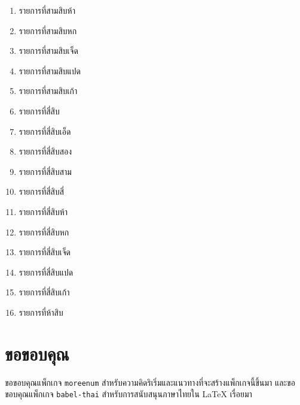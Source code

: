 \documentclass[11pt]{ltxguide}
\begin{document}
\begin{multicols}{4}
\begin{enumerate}[listparindent=0pc,topsep=0pc,itemsep=0pc,label={\thaimultialph*.}]
        \item  รายการที่สามสิบห้า
        \item  รายการที่สามสิบหก
        \item  รายการที่สามสิบเจ็ด
        \item  รายการที่สามสิบแปด
        \item  รายการที่สามสิบเก้า
        \item  รายการที่สี่สิบ
        \item  รายการที่สี่สิบเอ็ด
        \item  รายการที่สี่สิบสอง
        \item  รายการที่สี่สิบสาม
        \item  รายการที่สี่สิบสี่
        \item  รายการที่สี่สิบห้า
        \item  รายการที่สี่สิบหก
        \item  รายการที่สี่สิบเจ็ด
        \item  รายการที่สี่สิบแปด
        \item  รายการที่สี่สิบเก้า
        \item  รายการที่ห้าสิบ
    \end{enumerate}
\end{multicols}

\section{ขอขอบคุณ}

ขอขอบคุณแพ็กเกจ \texttt{moreenum} สำหรับความคิดริเริ่มและแนวทางที่จะสร้างแพ็กเกจนี้ขึ้นมา และขอขอบคุณแพ็กเกจ \texttt{babel-thai} สำหรับการสนับสนุนภาษาไทยใน \textlatin{\textrm\LaTeX} เรื่อยมา
\end{document}
